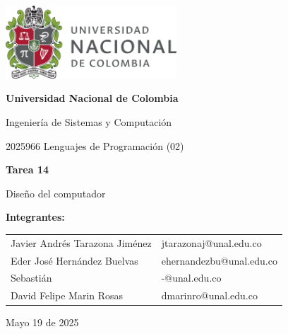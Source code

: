 \documentclass{article}
\begin{document}
\begin{titlepage}
  \centering
  \includegraphics[width=0.48\textwidth]{logo_universidad.png}
  \par\vspace{2cm}

  {\Large \textbf{Universidad Nacional de Colombia} \par}
  \vspace{0.5cm}
  {\large Ingeniería de Sistemas y Computación \par}
  {\large 2025966 Lenguajes de Programación (02)\par}
  \vspace{3cm}

  {\large \textbf{Tarea 14} \par}
  {\large Diseño del computador\par}
  \vspace{3cm}

  {\large \textbf{Integrantes:} \par}
  \vspace{0.5cm}
  \begin{tabular}{ll}
    Javier Andrés Tarazona Jiménez & jtarazonaj@unal.edu.co \\
    Eder  José Hernández Buelvas   & ehernandezbu@unal.edu.co \\
    Sebastián                      & -@unal.edu.co          \\
    David Felipe Marin Rosas       & dmarinro@unal.edu.co   \\
  \end{tabular}
  \par\vspace{3cm}

  {\large Mayo 19 de 2025 \par}
\end{titlepage}

\tableofcontents %

\newpage %
\end{document}
